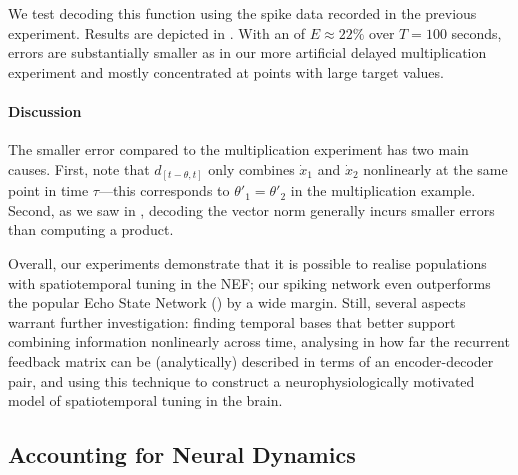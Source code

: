 We test decoding this function using the spike data recorded in the previous experiment.
Results are depicted in .
With an \NRMSE of $E \approx 22\%$ over $T = 100$ seconds, errors are substantially smaller as in our more artificial delayed multiplication experiment and mostly concentrated at points with large target values.

\paragraph{Discussion}
The smaller error compared to the multiplication experiment has two main causes.
First, note that $d_{[t - \theta, t]}$ only combines $\dot x_1$ and $\dot x_2$ nonlinearly at the same point in time $\tau$---this corresponds to $\theta'_1 = \theta'_2$ in the multiplication example.
Second, as we saw in , decoding the vector norm generally incurs smaller errors than computing a product.

Overall, our experiments demonstrate that it is possible to realise populations with spatiotemporal tuning in the NEF; our spiking network even outperforms the popular Echo State Network (\cite{jaeger2004harnessing}) by a wide margin.
Still, several aspects warrant further investigation: finding temporal bases that better support combining information nonlinearly across time, analysing in how far the recurrent feedback matrix can be (analytically) described in terms of an encoder-decoder pair, and using this technique to construct a neurophysiologically motivated model of spatiotemporal tuning in the brain.

\subsection{Accounting for Neural Dynamics}
